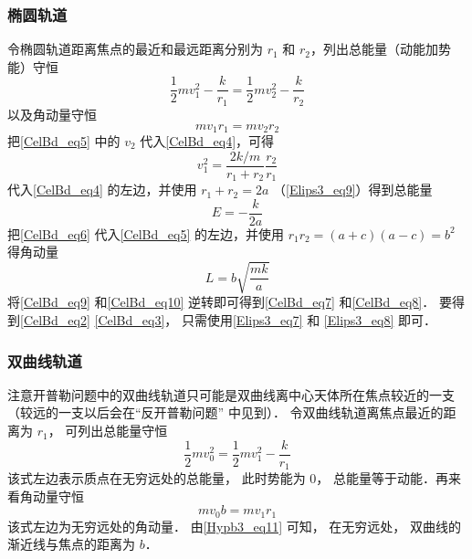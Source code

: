 \subsubsection{椭圆轨道}
令椭圆轨道距离焦点的最近和最远距离分别为 $r_1$ 和 $r_2$，列出总能量（动能加势能）守恒
\begin{equation}\label{CelBd_eq4}
\frac12 m v_1^2 - \frac{k}{r_1} = \frac12 mv_2^2 - \frac{k}{r_2}
\end{equation}
以及角动量守恒
\begin{equation}\label{CelBd_eq5}
mv_1 r_1 = mv_2 r_2
\end{equation}
把\autoref{CelBd_eq5} 中的 $v_2$ 代入\autoref{CelBd_eq4}，可得
\begin{equation}\label{CelBd_eq6}
v_1^2 = \frac{2k/m}{r_1 + r_2} \frac{r_2}{r_1}
\end{equation}
代入\autoref{CelBd_eq4} 的左边，并使用 $r_1+r_2=2a$ （\autoref{Elips3_eq9}）得到总能量
\begin{equation}\label{CelBd_eq9}
E = -\frac{k}{2a}
\end{equation}
把\autoref{CelBd_eq6} 代入\autoref{CelBd_eq5} 的左边，并使用 $r_1 r_2 = (a+c)(a-c) =b^2$ %
得角动量
\begin{equation}\label{CelBd_eq10}
L = b\sqrt{\frac{mk}{a}}
\end{equation}
将\autoref{CelBd_eq9} 和\autoref{CelBd_eq10} 逆转即可得到\autoref{CelBd_eq7} 和\autoref{CelBd_eq8}． 要得到\autoref{CelBd_eq2} \autoref{CelBd_eq3}， 只需使用\autoref{Elips3_eq7} 和 \autoref{Elips3_eq8} 即可．

\subsubsection{双曲线轨道}
注意开普勒问题中的双曲线轨道只可能是双曲线离中心天体所在焦点较近的一支（较远的一支以后会在“反开普勒问题” 中见到）． 令双曲线轨道离焦点最近的距离为 $r_1$， 可列出总能量守恒
\begin{equation}\label{CelBd_eq11}
\frac12 mv_0^2 = \frac12 mv_1^2 - \frac{k}{r_1}
\end{equation}
该式左边表示质点在无穷远处的总能量， 此时势能为 $0$， 总能量等于动能．再来看角动量守恒
\begin{equation}\label{CelBd_eq12}
m v_0 b = m v_1 r_1
\end{equation}
该式左边为无穷远处的角动量． 由\autoref{Hypb3_eq11} 可知， 在无穷远处， 双曲线的渐近线与焦点的距离为 $b$．

